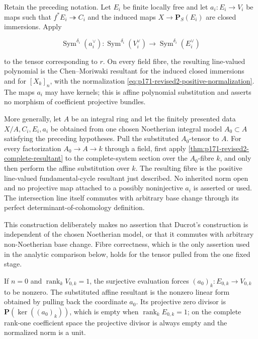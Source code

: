 \begin{theorem}
\label{thm:p171-revised2-one-stage-bridge}
Retain the preceding notation.  Let \(E_i\) be finite locally free and let
\(a_i:E_i\to V_i\) be maps such that
\(f^*E_i\twoheadrightarrow C_i\) and the induced maps
\(X\to\mathbf P_S(E_i)\) are closed immersions.  Apply

\[
 \operatorname{Sym}^{\delta_i}(a_i^\vee):
 \operatorname{Sym}^{\delta_i}(V_i^\vee)\longrightarrow
 \operatorname{Sym}^{\delta_i}(E_i^\vee)
\]

to the tensor corresponding to \(r\).  On every field fibre, the resulting
line-valued polynomial is the Chen--Moriwaki resultant
\cite[Definition~1.6.3]{ChenMoriwaki21AdelicIntersection} for the induced
closed immersions and for \([X_k]_n\), with the normalization
\eqref{eq:p171-revised2-positive-normalization}.  The maps \(a_i\) may have
kernels; this is affine polynomial substitution and asserts no morphism of
coefficient projective bundles.

More generally, let \(A\) be an integral ring and let the finitely presented
data \(X/A,C_i,E_i,a_i\) be obtained from one chosen Noetherian integral
model \(A_0\subset A\) satisfying the preceding hypotheses.  Pull the
substituted \(A_0\)-tensor to \(A\).  For every factorization
\(A_0\to A\to k\) through a field, first apply
\cref{thm:p171-revised2-complete-resultant} to the complete-system
section over the \(A_0\)-fibre \(k\), and only then perform the affine
substitution over \(k\).  The resulting fibre is the positive line-valued
fundamental-cycle resultant just described.  No inherited norm open and no
projective map attached to a possibly noninjective \(a_i\) is asserted or
used.  The intersection line itself commutes with arbitrary base change
through its perfect determinant-of-cohomology definition.

This construction deliberately makes no assertion that Ducrot's
construction \cite[Section~6.3]{Ducrot97CubeIntersection} is
independent of the chosen Noetherian model, or that
it commutes with arbitrary non-Noetherian base change.  Fibre correctness,
which is the only assertion used in the analytic comparison below, holds
for the tensor
pulled from the one fixed stage.

If \(n=0\) and \(\operatorname{rank}_kV_{0,k}=1\), the surjective
evaluation forces \((a_0)_k:E_{0,k}\to V_{0,k}\) to be nonzero.  The
substituted affine resultant is the nonzero linear form obtained by pulling
back the coordinate \(a_0\).  Its projective zero divisor is
\(\mathbf P(\ker((a_0)_k))\), which is empty when
\(\operatorname{rank}_kE_{0,k}=1\); on the complete rank-one coefficient
space the projective divisor is always empty and the normalized norm is a
unit.
\end{theorem}

